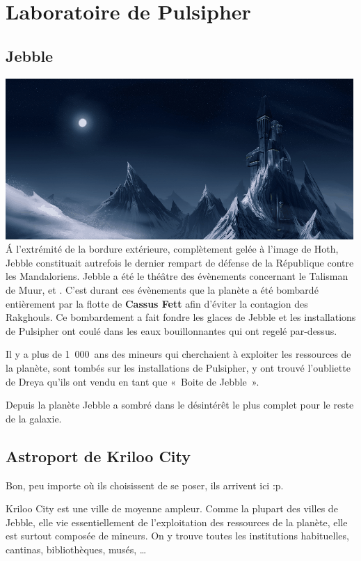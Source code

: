 \section{Laboratoire de Pulsipher}

\subsection{Jebble}\label{sec:jebble}
\noindent\includegraphics[width=\linewidth]{_img/places/jebble.png}
\'A l’extrémité de la bordure extérieure, complètement gelée à l’image de Hoth, Jebble constituait autrefois le dernier rempart de défense de la République contre les Mandaloriens. Jebble a été le théâtre des évènements concernant le Talisman de Muur,  et . C’est durant ces évènements que la planète a été bombardé entièrement par la flotte de \textbf{Cassus Fett} afin d’éviter la contagion des Rakghouls. Ce bombardement a fait fondre les glaces de Jebble et les installations de Pulsipher ont coulé dans les eaux bouillonnantes qui ont regelé par-dessus.

Il y a plus de 1~000~ans des mineurs qui cherchaient à exploiter les ressources de la planète, sont tombés sur les installations de Pulsipher, y ont trouvé l’oubliette de Dreya qu’ils ont vendu en tant que «~Boite de Jebble~».

Depuis la planète Jebble a sombré dans le désintérêt le plus complet pour le reste de la galaxie.

\subsection{Astroport de Kriloo City}
Bon, peu importe où ils choisissent de se poser, ils arrivent ici :p.

Kriloo City est une ville de moyenne ampleur. Comme la plupart des villes de Jebble, elle vie essentiellement de l’exploitation des ressources de la planète, elle est surtout composée de mineurs. On y trouve toutes les institutions habituelles, cantinas, bibliothèques, musés, \ldots

